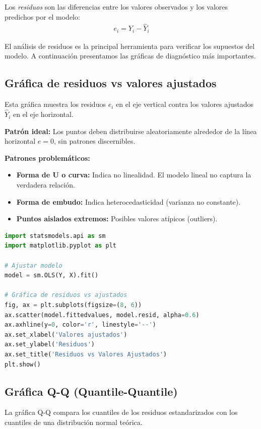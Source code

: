 Los \emph{residuos} son las diferencias entre los valores observados y los valores predichos por el modelo:
\begin{align}
	e_i = Y_i - \hat{Y}_i
\end{align}

El análisis de residuos es la principal herramienta para verificar los supuestos del modelo. A continuación presentamos las gráficas de diagnóstico más importantes.

\subsection{Gráfica de residuos vs valores ajustados}

Esta gráfica muestra los residuos $e_i$ en el eje vertical contra los valores ajustados $\hat{Y}_i$ en el eje horizontal.

\textbf{Patrón ideal:} Los puntos deben distribuirse aleatoriamente alrededor de la línea horizontal $e = 0$, sin patrones discernibles.

\textbf{Patrones problemáticos:}
\begin{itemize}
	\item \textbf{Forma de U o curva:} Indica no linealidad. El modelo lineal no captura la verdadera relación.
	\item \textbf{Forma de embudo:} Indica heterocedasticidad (varianza no constante).
	\item \textbf{Puntos aislados extremos:} Posibles valores atípicos (outliers).
\end{itemize}

\begin{lstlisting}[language=Python]
import statsmodels.api as sm
import matplotlib.pyplot as plt

# Ajustar modelo
model = sm.OLS(Y, X).fit()

# Gráfica de residuos vs ajustados
fig, ax = plt.subplots(figsize=(8, 6))
ax.scatter(model.fittedvalues, model.resid, alpha=0.6)
ax.axhline(y=0, color='r', linestyle='--')
ax.set_xlabel('Valores ajustados')
ax.set_ylabel('Residuos')
ax.set_title('Residuos vs Valores Ajustados')
plt.show()
\end{lstlisting}

\subsection{Gráfica Q-Q (Quantile-Quantile)}

La gráfica Q-Q compara los cuantiles de los residuos estandarizados con los cuantiles de una distribución normal teórica.

